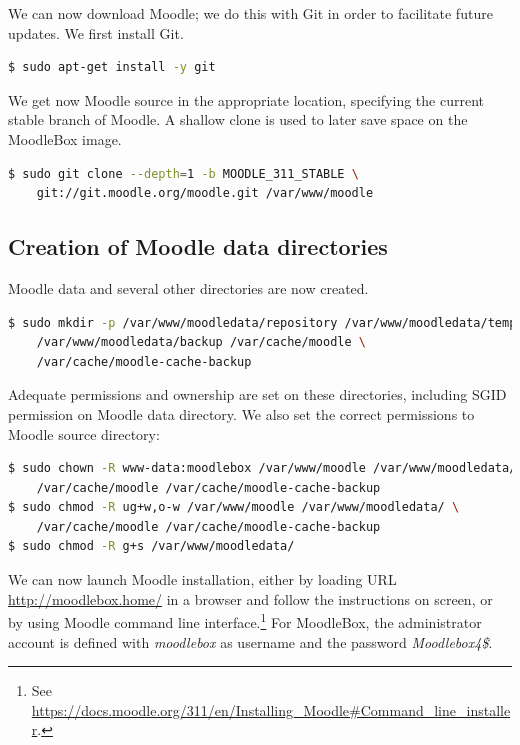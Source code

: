 \documentclass[12pt]{article}
\begin{document}
We can now download Moodle; we do this with Git in order to facilitate future updates.
We first install Git.
\begin{lstlisting}[language=bash]
$ sudo apt-get install -y git
\end{lstlisting}

We get now Moodle source in the appropriate location, specifying the current stable branch of Moodle.
A shallow clone is used to later save space on the MoodleBox image.
\begin{lstlisting}[language=bash]
$ sudo git clone --depth=1 -b MOODLE_311_STABLE \
    git://git.moodle.org/moodle.git /var/www/moodle
\end{lstlisting}

\subsection{Creation of Moodle data directories}

Moodle data and several other directories are now created.
\begin{lstlisting}[language=bash]
$ sudo mkdir -p /var/www/moodledata/repository /var/www/moodledata/temp \
    /var/www/moodledata/backup /var/cache/moodle \
    /var/cache/moodle-cache-backup
\end{lstlisting}
Adequate permissions and ownership are set on these directories, including SGID permission on Moodle data directory.
We also set the correct permissions to Moodle source directory:
\begin{lstlisting}[language=bash]
$ sudo chown -R www-data:moodlebox /var/www/moodle /var/www/moodledata/ \
    /var/cache/moodle /var/cache/moodle-cache-backup
$ sudo chmod -R ug+w,o-w /var/www/moodle /var/www/moodledata/ \
    /var/cache/moodle /var/cache/moodle-cache-backup
$ sudo chmod -R g+s /var/www/moodledata/
\end{lstlisting}

We can now launch Moodle installation, either by loading URL \url{http://moodlebox.home/} in a browser and follow the instructions on screen, or by using Moodle command line interface.\footnote{See \url{https://docs.moodle.org/311/en/Installing_Moodle\#Command_line_installer}.}
For MoodleBox, the administrator account is defined with \emph{moodlebox} as username and the password \emph{Moodlebox4\$}.
\end{document}
